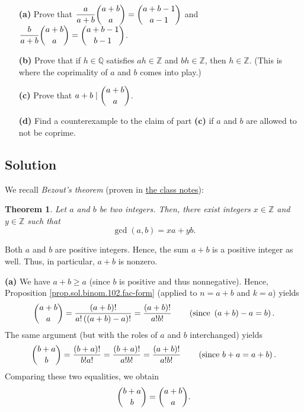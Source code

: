 \documentclass[paper=a4, fontsize=12pt]{scrartcl}%
\theoremstyle{plainsl}
\newtheorem{theorem}{Theorem}[section]
\theoremstyle{definition}
\theoremstyle{remark}
\begin{document}
\begin{enumerate}
\item[\textbf{(a)}] Prove that $\dfrac{a}{a+b} \dbinom{a+b}{a} =
\dbinom{a+b-1}{a-1}$ and $\dfrac{b}{a+b} \dbinom{a+b}{a} = \dbinom{a+b-1}%
{b-1}$.

\item[\textbf{(b)}] Prove that if $h \in\mathbb{Q}$ satisfies $ah
\in\mathbb{Z}$ and $bh \in\mathbb{Z}$, then $h \in\mathbb{Z}$. (This is where
the coprimality of $a$ and $b$ comes into play.)

\item[\textbf{(c)}] Prove that $a+b \mid\dbinom{a+b}{a}$.

\item[\textbf{(d)}] Find a counterexample to the claim of part \textbf{(c)} if
$a$ and $b$ are allowed to not be coprime.
\end{enumerate}

\subsection{Solution}

We recall \textit{Bezout's theorem} (proven in
\href{http://www-users.math.umn.edu/~dgrinber/19s/notes.pdf}{the class notes}):

\begin{theorem}
\label{thm.ent.gcd.bezout}Let $a$ and $b$ be two integers. Then, there exist
integers $x\in\mathbb{Z}$ and $y\in\mathbb{Z}$ such that%
\[
\gcd\left(  a,b\right)  =xa+yb.
\]

\end{theorem}

Both $a$ and $b$ are positive integers. Hence, the sum $a+b$ is a positive
integer as well. Thus, in particular, $a+b$ is nonzero.

\textbf{(a)} We have $a+b\geq a$ (since $b$ is positive and thus nonnegative).
Hence, Proposition \ref{prop.sol.binom.102.fac-form} (applied to $n=a+b$ and
$k=a$) yields
\[
\dbinom{a+b}{a}=\dfrac{\left(  a+b\right)  !}{a!\left(  \left(  a+b\right)
-a\right)  !}=\dfrac{\left(  a+b\right)  !}{a!b!}\qquad\left(  \text{since
}\left(  a+b\right)  -a=b\right)  .
\]
The same argument (but with the roles of $a$ and $b$ interchanged) yields
\[
\dbinom{b+a}{b}=\dfrac{\left(  b+a\right)  !}{b!a!}=\dfrac{\left(  b+a\right)
!}{a!b!}=\dfrac{\left(  a+b\right)  !}{a!b!}\qquad\left(  \text{since
}b+a=a+b\right)  .
\]
Comparing these two equalities, we obtain%
\begin{equation}
\dbinom{b+a}{b}=\dbinom{a+b}{a}. \label{sol.binom.coprime-rat-cat-1.symm}%
\end{equation}
\end{document}
